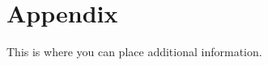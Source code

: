 \documentclass[12pt, titlepage]{article}
\begin{document}

\newpage

\section{Appendix}

This is where you can place additional information.
\end{document}
